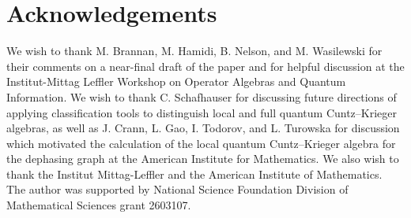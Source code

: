 \documentclass[11pt]{article}
\theoremstyle{plain}
\theoremstyle{nonumberplain}
\theoremstyle{plain}
\theoremstyle{nonumberplain}
\newcommand\1{{\bf 1}}
\newcommand{\<}{\left\langle}
\renewcommand{\>}{\right\rangle}
\begin{document}
\section*{Acknowledgements}
We wish to thank M. Brannan, M. Hamidi, B. Nelson, and M. Wasilewski for their comments on a near-final draft of the paper and for helpful discussion at the Institut-Mittag Leffler Workshop on Operator Algebras and Quantum Information. We wish to thank C. Schafhauser for discussing future directions of applying classification tools to distinguish local and full quantum Cuntz--Krieger algebras, as well as J. Crann, L. Gao, I. Todorov, and L. Turowska for discussion which motivated the calculation of the local quantum Cuntz--Krieger algebra for the dephasing graph at the American Institute for Mathematics. We also wish to thank the Institut Mittag-Leffler and the American Institute of Mathematics. The author was supported by National Science Foundation Division of Mathematical Sciences grant 2603107.



\end{document}
